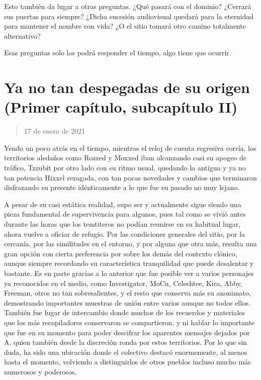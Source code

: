 \documentclass[
  spanish,
]{book}
\begin{document}
Esto también da lugar a otras preguntas. ¿Qué pasará con el dominio? ¿Cerrará sus puertas para siempre? ¿Dicha sucesión audiovisual quedará para la eternidad para mantener el nombre con vida? ¿O el sitio tomará otro camino totalmente alternativo?

Esas preguntas solo las podrá responder el tiempo, algo tiene que ocurrir.

\hypertarget{ya-no-tan-despegadas-de-su-origen-primer-capuxedtulo-subcapuxedtulo-ii}{%
\section{Ya no tan despegadas de su origen (Primer capítulo, subcapítulo II)}\label{ya-no-tan-despegadas-de-su-origen-primer-capuxedtulo-subcapuxedtulo-ii}}

\begin{quote}
17 de enero de 2021
\end{quote}

Yendo un poco atrás en el tiempo, mientras el reloj de cuenta regresiva corría, los territorios aledaños como Rozzed y Moxxed iban alcanzando casi su apogeo de tráfico, Tzzubit por otro lado con su ritmo usual, quedando la antigua y ya no tan potencia Hixxel rezagada, con tan pocas novedades y cambios que terminaron disfrazando su presente idénticamente a lo que fue su pasado no muy lejano.

A pesar de su casi estática realidad, supo ser y actualmente sigue siendo una pieza fundamental de supervivencia para algunos, pues tal como se vivió antes durante las horas que los temtiteros no podían reunirse en su habitual lugar, ahora vuelve a oficiar de refugio. Por las condiciones generales del sitio, por la cercanía, por las similitudes en el entorno, y por alguna que otra más, resulta una gran opción con cierta preferencia por sobre los demás del contexto clónico, aunque siempre recordando su característica tranquilidad que puede desalentar y bastante. Es en parte gracias a lo anterior que fue posible ver a varios personajes ya reconocidos en el medio, como Investigator, MoCn, Celeshtee, Kira, Abby, Freeman, otros no tan sobresalientes, y el resto que conserva más su anonimato, demostrando importantes muestras de unión entre varios aunque no todos ellos. También fue lugar de intercambio donde muchos de los recuerdos y materiales que los más recopiladores conservaron se compartieron, y ni hablar lo importante que fue en su momento para poder descifrar los aparentes mensajes dejados por A. quien también desde la discreción ronda por estos territorios. Por lo que sin duda, ha sido una ubicación donde el colectivo destacó enormemente, al menos hasta el momento, volviendo a distinguirlos de otros pueblos incluso mucho más numerosos y poderosos.
\end{document}
